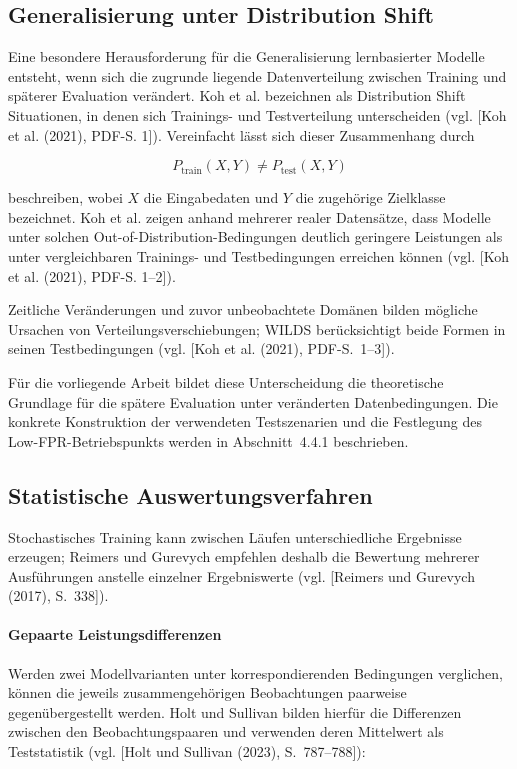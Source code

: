 \subsection{Generalisierung unter Distribution Shift}

Eine besondere Herausforderung für die Generalisierung lernbasierter Modelle
entsteht, wenn sich die zugrunde liegende Datenverteilung zwischen Training und
späterer Evaluation verändert. Koh et al. bezeichnen als Distribution Shift
Situationen, in denen sich Trainings- und Testverteilung unterscheiden
(vgl. [Koh et al. (2021), PDF-S. 1]). Vereinfacht lässt sich dieser Zusammenhang
durch

\[
P_{\mathrm{train}}(X,Y) \neq P_{\mathrm{test}}(X,Y)
\]

beschreiben, wobei \(X\) die Eingabedaten und \(Y\) die zugehörige Zielklasse
bezeichnet. Koh et al. zeigen anhand mehrerer realer Datensätze, dass Modelle
unter solchen Out-of-Distribution-Bedingungen deutlich geringere Leistungen
als unter vergleichbaren Trainings- und Testbedingungen erreichen können
(vgl. [Koh et al. (2021), PDF-S. 1--2]).

Zeitliche Veränderungen und zuvor unbeobachtete Domänen bilden mögliche Ursachen von Verteilungsverschiebungen; WILDS berücksichtigt beide Formen in seinen Testbedingungen (vgl. [Koh et al. (2021), PDF-S.~1--3]).

Für die vorliegende Arbeit bildet diese Unterscheidung die theoretische
Grundlage für die spätere Evaluation unter veränderten Datenbedingungen.
Die konkrete Konstruktion der verwendeten Testszenarien und die Festlegung des
Low-FPR-Betriebspunkts werden in Abschnitt~4.4.1 beschrieben.

\subsection{Statistische Auswertungsverfahren}

Stochastisches Training kann zwischen Läufen unterschiedliche Ergebnisse erzeugen; Reimers und Gurevych empfehlen deshalb die Bewertung mehrerer Ausführungen anstelle einzelner Ergebniswerte (vgl. [Reimers und Gurevych (2017), S.~338]).

\paragraph{Gepaarte Leistungsdifferenzen}
Werden zwei Modellvarianten unter korrespondierenden Bedingungen verglichen,
können die jeweils zusammengehörigen Beobachtungen paarweise gegenübergestellt
werden. Holt und Sullivan bilden hierfür die Differenzen zwischen den
Beobachtungspaaren und verwenden deren Mittelwert als Teststatistik
(vgl. [Holt und Sullivan (2023), S.~787--788]):

